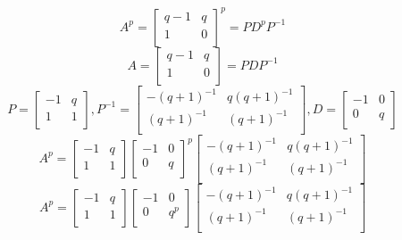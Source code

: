 \documentclass[paper.tex]{subfiles}
\begin{document}
\[ A^{p} = 
\left[ \begin{array}{ccc}
q-1 & q \\
1 & 0 \\
\end{array} \right] ^{p}
=
PD^{p}P^{-1}
\] 
\[ A = 
\left[ \begin{array}{ccc}
q-1 & q \\
1 & 0 \\
\end{array} \right]
=
PDP^{-1}
\] 
\[ P = 
\left[ \begin{array}{ccc}
-1 & q \\
1 & 1 \\
\end{array} \right]
, P^{-1} =
\left[ \begin{array}{ccc}
-(q+1)^{-1} & q(q+1)^{-1} \\
(q+1)^{-1} & (q+1)^{-1} \\
\end{array} \right]
, D = 
\left[ \begin{array}{ccc}
-1 & 0 \\
0 & q \\
\end{array} \right]
\] 
\[ A^{p}
=
\left[ \begin{array}{ccc}
-1 & q \\
1 & 1 \\
\end{array} \right]
\left[ \begin{array}{ccc}
-1 & 0 \\
0 & q \\
\end{array} \right] ^{p}
\left[ \begin{array}{ccc}
-(q+1)^{-1} & q(q+1)^{-1} \\
(q+1)^{-1} & (q+1)^{-1} \\
\end{array} \right]
\]
\[ A^{p}
=
\left[ \begin{array}{ccc}
-1 & q \\
1 & 1 \\
\end{array} \right]
\left[ \begin{array}{ccc}
-1 & 0 \\
0 & q^{p} \\
\end{array} \right] 
\left[ \begin{array}{ccc}
-(q+1)^{-1} & q(q+1)^{-1} \\
(q+1)^{-1} & (q+1)^{-1} \\
\end{array} \right]
\]
\end{document}
